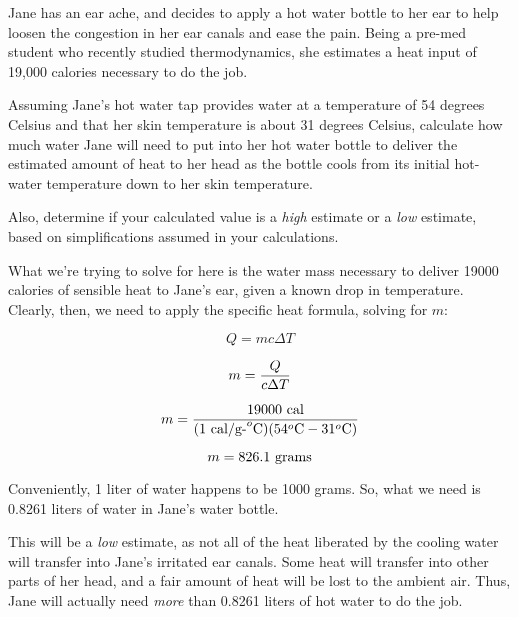 

Jane has an ear ache, and decides to apply a hot water bottle to her ear to help loosen the congestion in her ear canals and ease the pain.  Being a pre-med student who recently studied thermodynamics, she estimates a heat input of 19,000 calories necessary to do the job.

\vskip 10pt

Assuming Jane's hot water tap provides water at a temperature of 54 degrees Celsius and that her skin temperature is about 31 degrees Celsius, calculate how much water Jane will need to put into her hot water bottle to deliver the estimated amount of heat to her head as the bottle cools from its initial hot-water temperature down to her skin temperature.  

\vskip 10pt

Also, determine if your calculated value is a {\it high} estimate or a {\it low} estimate, based on simplifications assumed in your calculations.







What we're trying to solve for here is the water mass necessary to deliver 19000 calories of sensible heat to Jane's ear, given a known drop in temperature.  Clearly, then, we need to apply the specific heat formula, solving for $m$:

$$Q = mc \Delta T$$

$$m = {Q \over c \Delta T}$$

$$m = {19000 \hbox{ cal} \over (1 \hbox{ cal/g-}^o\hbox{C}) (54^o\hbox{C} - 31^o\hbox{C})}$$

$$m = 826.1 \hbox{ grams}$$

Conveniently, 1 liter of water happens to be 1000 grams.  So, what we need is 0.8261 liters of water in Jane's water bottle.  

\vskip 10pt

This will be a {\it low} estimate, as not all of the heat liberated by the cooling water will transfer into Jane's irritated ear canals.  Some heat will transfer into other parts of her head, and a fair amount of heat will be lost to the ambient air.  Thus, Jane will actually need {\it more} than 0.8261 liters of hot water to do the job.











